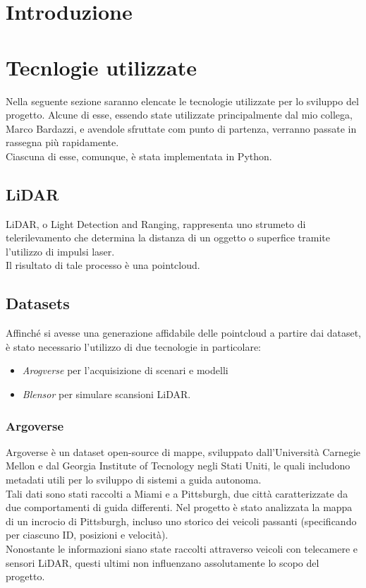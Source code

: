 \documentclass[italian]{article}
\begin{document}
\justifying
\section*{Introduzione}

\section*{Tecnlogie utilizzate}
Nella seguente sezione saranno elencate le tecnologie utilizzate per lo sviluppo del progetto. Alcune di esse, essendo state utilizzate principalmente dal mio collega, Marco Bardazzi, e avendole sfruttate com punto di partenza, verranno passate in rassegna più rapidamente.\\
Ciascuna di esse, comunque, è stata implementata in Python.
\subsection{LiDAR}
LiDAR, o Light Detection and Ranging, rappresenta uno strumeto di telerilevamento che determina la distanza di un oggetto o superfice tramite l'utilizzo di impulsi laser.\\
Il risultato di tale processo è una pointcloud.
\subsection{Datasets}
Affinché si avesse una generazione affidabile delle pointcloud a partire dai dataset, è stato necessario l'utilizzo di due tecnologie in particolare:
\begin{itemize}
	\item\textit{Arogverse} per l'acquisizione di scenari e modelli 
	\item\textit{Blensor} per simulare scansioni LiDAR.
\end{itemize}
\subsubsection{Argoverse}
Argoverse è un dataset open-source di mappe, sviluppato dall'Università Carnegie Mellon e dal Georgia Institute of Tecnology negli Stati Uniti, le quali includono metadati utili per lo sviluppo di sistemi a guida autonoma.\\
Tali dati sono stati raccolti a Miami e a Pittsburgh, due città caratterizzate da due comportamenti di guida differenti. Nel progetto è stato analizzata la mappa di un incrocio di Pittsburgh, incluso uno storico dei veicoli passanti (specificando per ciascuno ID, posizioni e velocità).\\
Nonostante le informazioni siano state raccolti attraverso veicoli con telecamere e sensori LiDAR, questi ultimi non influenzano assolutamente lo scopo del progetto.
\end{document}
